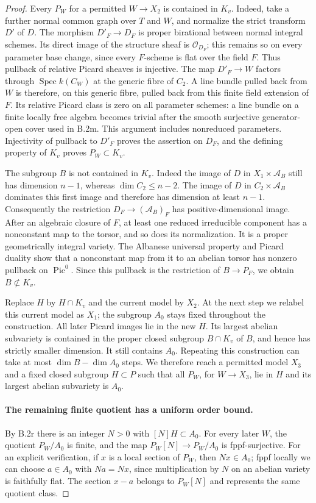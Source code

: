 \begin{proof}
Every $P_W$ for a permitted $W\to X_2$ is contained in $K_v$.
Indeed, take a further normal common graph over $T$ and $W$,
and normalize the strict transform $D'$ of $D$.  The morphism
$D'_F\to D_F$ is proper birational between normal integral
schemes.  Its direct image of the structure sheaf
is $\mathcal O_{D_F}$; this remains so on every parameter base
change, since every $F$-scheme is flat over the field $F$.
Thus pullback of relative Picard sheaves
is injective.  The map $D'_F\to W$ factors through
$\operatorname{Spec}k(C_W)$ at the generic fibre of $C_2$.
A line bundle pulled back from $W$ is therefore, on this
generic fibre, pulled back from this finite field extension of
$F$.  Its relative Picard class is zero on all parameter
schemes: a line bundle on a finite locally free algebra becomes
trivial after the smooth surjective generator-open cover used
in B.2m.  This argument includes nonreduced parameters.
Injectivity of pullback to $D'_F$ proves the assertion on $D_F$,
and the defining property of $K_v$ proves $P_W\subset K_v$.

The subgroup $B$ is not contained in $K_v$.
Indeed the image of $D$ in $X_1\times\mathcal A_B$ still has
dimension $n-1$, whereas $\dim C_2\le n-2$.
The image of $D$ in $C_2\times\mathcal A_B$ dominates this
first image and therefore has dimension at least $n-1$.
Consequently the restriction $D_F\to(\mathcal A_B)_F$ has
positive-dimensional image.  After an algebraic closure of
$F$, at least one reduced irreducible component has a
nonconstant map to the torsor, and so does its normalization.
It is a proper geometrically integral variety.  The Albanese
universal property and Picard duality show that a nonconstant
map from it to an abelian torsor has nonzero pullback on
$\operatorname{Pic}^0$.  Since this pullback is the restriction
of $B\to P_F$, we obtain $B\not\subset K_v$.

Replace $H$ by $H\cap K_v$ and the current model by $X_2$.
At the next step we relabel this current model as $X_1$;
the subgroup $A_0$ stays fixed throughout the construction.
All later Picard images lie in the new $H$.  Its largest
abelian subvariety is contained in the proper closed subgroup
$B\cap K_v$ of $B$, and hence has strictly smaller dimension.
It still contains $A_0$.  Repeating this construction can take
at most $\dim B-\dim A_0$ steps.  We therefore reach a permitted
model $X_3$ and a fixed closed subgroup $H\subset P$ such that
all $P_W$, for $W\to X_3$, lie in $H$ and its largest abelian
subvariety is $A_0$.

\paragraph{The remaining finite quotient has a uniform order bound.}
By B.2r there is an integer $N>0$ with $[N]H\subset A_0$.
For every later $W$, the quotient $P_W/A_0$ is finite, and
the map $P_W[N]\to P_W/A_0$ is fppf-surjective.
For an explicit verification, if $x$ is a local section of
$P_W$, then $Nx\in A_0$; fppf locally we can choose
$a\in A_0$ with $Na=Nx$, since multiplication by $N$ on an
abelian variety is faithfully flat.  The section $x-a$ belongs
to $P_W[N]$ and represents the same quotient class.


\end{proof}
